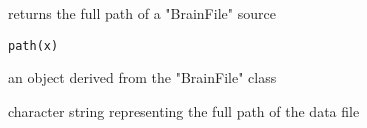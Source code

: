 \begin{Description}\relax
returns the full path of a "BrainFile" source
\end{Description}
\begin{Usage}
\begin{verbatim}
path(x)
\end{verbatim}
\end{Usage}
\begin{Arguments}
\begin{ldescription}
\item[\code{x}] an object derived from the "BrainFile" class  
\end{ldescription}
\end{Arguments}
\begin{Value}
character string representing the full path of the data file
\end{Value}

